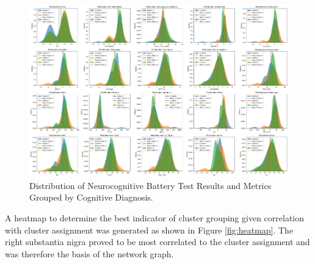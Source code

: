 \documentclass[12pt]{article}
\begin{document}
\begin{figure}[h]  %
    \centering
    \includegraphics[width=\textwidth]{"../img/pdf_of_clustered_test_results.png"}  %
    \caption{Distribution of Neurocognitive Battery Test Results and Metrics Grouped by Cognitive Diagnosis.}
    \label{fig:pdf}  %
\end{figure}

\FloatBarrier

A heatmap to determine the best indicator of cluster grouping given correlation with cluster assignment was generated as shown in Figure \ref{fig:heatmap}. The right substantia nigra proved to be most correlated to the cluster assignment and was therefore the basis of the network graph.
\end{document}

